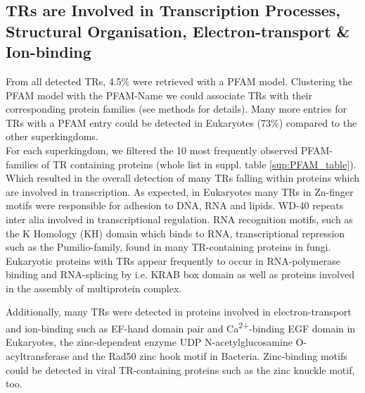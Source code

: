 \documentclass[a4,center,fleqn]{NAR}
\begin{document}
\subsection{TRs are Involved in Transcription Processes, Structural Organisation, Electron-transport \& Ion-binding}
From all detected TRs, 4.5\% were retrieved with a PFAM model. Clustering the PFAM model with the PFAM-Name we could associate TRs with their corresponding protein families (see methods for details). Many more entries for TRs with a PFAM entry could be detected in Eukaryotes (73\%) compared to the other superkingdoms.\\
For each superkingdom, we filtered the 10 most frequently observed PFAM-families of TR containing proteins (whole list in suppl. table \ref{sup:PFAM_table}).
Which resulted in the overall detection of many TRs falling within proteins which are involved in transcription. 
As expected, in Eukaryotes many TRs in Zn-finger motifs were responsible for adhesion to DNA, RNA and lipids. WD-40 repeats inter alia involved in transcriptional regulation. RNA recognition motifs, such as the K Homology (KH) domain which binds to RNA, transcriptional repression such as the Pumilio-family, found in many TR-containing proteins in fungi. Eukaryotic proteins with TRs appear frequently to occur in  RNA-polymerase binding and RNA-splicing by i.e. KRAB box domain as well as proteins involved in the assembly of multiprotein complex.

Additionally, many TRs were detected in proteins involved in electron-transport and ion-binding such as EF-hand domain pair and Ca\textsuperscript{2+}-binding EGF domain in Eukaryotes, the zinc-dependent enzyme UDP N-acetylglucosamine O-acyltransferase and the Rad50 zinc hook motif in Bacteria. Zinc-binding motifs could be detected in viral TR-containing proteins such as the zinc knuckle motif, too.
\end{document}
